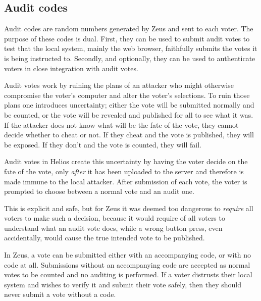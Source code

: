 \documentclass[jets]{usenixjournal}
\begin{document}
\subsection{Audit codes}
\label{sec:audit_codes}
Audit codes are random numbers generated by Zeus and sent to each voter.
The purpose of these codes is dual.
First, they can be used to submit audit votes to test that the local
system, mainly the web browser, faithfully submits the votes it is
being instructed to.
Secondly, and optionally, they can be used to authenticate voters in close
integration with audit votes.

Audit votes work by ruining the plans of an attacker who might otherwise
compromise the voter's computer and alter the voter's selections.
To ruin those plans one introduces uncertainty;
either the vote will be submitted normally and be counted,
or the vote will be revealed and published for all to see what it was.
If the attacker does not know what will be the fate of the vote,
they cannot decide whether to cheat or not.
If they cheat and the vote is published, they will be exposed.
If they don't and the vote is counted, they will fail.

Audit votes in Helios create this uncertainty by having the voter decide
on the fate of the vote, only \emph{after} it has been uploaded to the
server and therefore is made immune to the local attacker.
After submission of each vote, the voter is prompted to choose
between a normal vote and an audit one.

This is explicit and safe, but for Zeus it was deemed too dangerous to
\emph{require} all voters to make such a decision, because it would
require of all voters to understand what an audit vote does,
while a wrong button press, even accidentally,
would cause the true intended vote to be published.

In Zeus, a vote can be submitted either with an accompanying code,
or with no code at all.
Submissions without an accompanying code are accepted
as normal votes to be counted and no auditing is performed.
If a voter distrusts their local system and wishes to verify it
and submit their vote safely, then they should never submit
a vote without a code.
\end{document}
